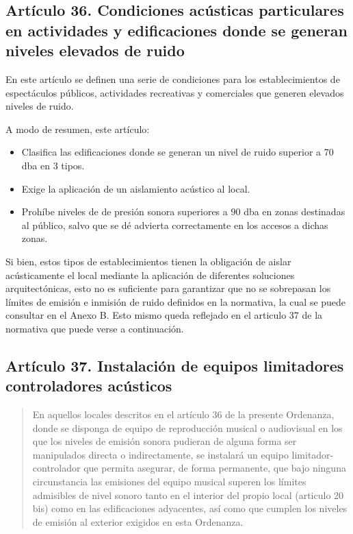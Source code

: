 \subsection{Artículo 36. Condiciones acústicas particulares en actividades y edificaciones donde se generan niveles elevados de ruido}

En este artículo se definen una serie de condiciones para los establecimientos de espectáculos públicos, actividades recreativas y comerciales que generen elevados niveles de ruido.

A modo de resumen, este artículo:

\begin{itemize}
    \item Clasifica las edificaciones donde se generan un nivel de ruido superior a 70 \gls{dba} en 3 tipos.

    \item Exige la aplicación de un aislamiento acústico al local.

    \item Prohíbe niveles de de presión sonora superiores a 90 \gls{dba} en zonas destinadas al público, salvo que se dé advierta correctamente en los accesos a dichas zonas.
\end{itemize}

%

Si bien, estos tipos de establecimientos tienen la obligación de aislar acústicamente el local mediante la aplicación de diferentes soluciones arquitectónicas, esto no es suficiente para garantizar que no se sobrepasan los límites de emisión e inmisión de ruido definidos en la normativa, la cual se puede consultar en el Anexo B. Esto mismo queda reflejado en el articulo 37 de la normativa que puede verse a continuación.

\subsection{Artículo 37. Instalación de equipos limitadores controladores acústicos}

\begin{quote}
    En aquellos locales descritos en el artículo 36 de la presente Ordenanza, donde se disponga de equipo de reproducción musical o audiovisual en los que los niveles de emisión sonora pudieran de alguna forma ser manipulados directa o indirectamente, se instalará un equipo limitador-controlador que permita asegurar, de forma permanente, que bajo ninguna circunstancia las emisiones del equipo musical superen los límites admisibles de nivel sonoro tanto en el interior del propio local (articulo 20 bis) como en las edificaciones adyacentes, así como que cumplen los niveles de emisión al exterior exigidos en esta Ordenanza.
\end{quote}

